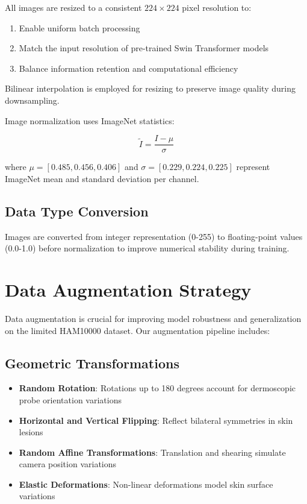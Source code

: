 All images are resized to a consistent $224 \times 224$ pixel resolution to:

\begin{enumerate}
    \item Enable uniform batch processing
    \item Match the input resolution of pre-trained Swin Transformer models
    \item Balance information retention and computational efficiency
\end{enumerate}

Bilinear interpolation is employed for resizing to preserve image quality during downsampling.

Image normalization uses ImageNet statistics:

\begin{equation}
\tilde{I} = \frac{I - \mu}{\sigma}
\end{equation}

where $\mu = [0.485, 0.456, 0.406]$ and $\sigma = [0.229, 0.224, 0.225]$ represent ImageNet mean and standard deviation per channel.

\subsection{Data Type Conversion}

Images are converted from integer representation (0-255) to floating-point values (0.0-1.0) before normalization to improve numerical stability during training.

\section{Data Augmentation Strategy}

Data augmentation is crucial for improving model robustness and generalization on the limited HAM10000 dataset. Our augmentation pipeline includes:

\subsection{Geometric Transformations}

\begin{itemize}
    \item \textbf{Random Rotation}: Rotations up to 180 degrees account for dermoscopic probe orientation variations
    \item \textbf{Horizontal and Vertical Flipping}: Reflect bilateral symmetries in skin lesions
    \item \textbf{Random Affine Transformations}: Translation and shearing simulate camera position variations
    \item \textbf{Elastic Deformations}: Non-linear deformations model skin surface variations
\end{itemize}

